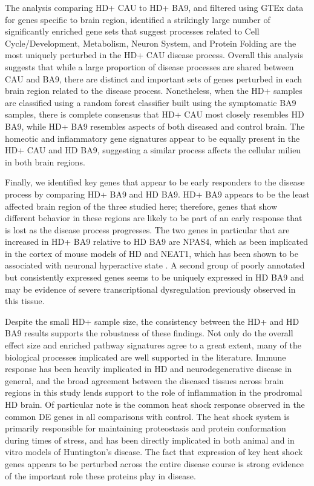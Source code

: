 \documentclass[fleqn,10pt,table]{wlscirep}
\begin{document}
The analysis comparing HD+ CAU to HD+ BA9, and filtered using GTEx data for genes specific to brain region, identified a strikingly large number of significantly enriched gene sets that suggest processes related to Cell Cycle/Development, Metabolism, Neuron System, and Protein Folding are the most uniquely perturbed in the HD+ CAU disease process.
Overall this analysis suggests that while a large proportion of disease processes are shared between CAU and BA9, there are distinct and important sets of genes perturbed in each brain region related to the disease process.
Nonetheless, when the HD+ samples are classified using a random forest classifier built using the symptomatic BA9 samples, there is complete consensus that HD+ CAU most closely resembles HD BA9, while HD+ BA9 resembles aspects of both diseased and control brain.
The homeotic and inflammatory gene signatures appear to be equally present in the HD+ CAU and HD BA9, suggesting a similar process affects the cellular milieu in both brain regions.

Finally, we identified key genes that appear to be early responders to the disease process by comparing HD+ BA9 and HD BA9.
HD+ BA9 appears to be the least affected brain region of the three studied here; therefore, genes that show different behavior in these regions are likely to be part of an early response that is lost as the disease process progresses.
The two genes in particular that are increased in HD+ BA9 relative to HD BA9 are NPAS4, which as been implicated in the cortex of mouse models of HD \cite{Vashishtha2013-su} and NEAT1, which has been shown to be associated with neuronal hyperactive state \cite{Barry2017-it}.
A second group of poorly annotated but consistently expressed genes seems to be uniquely expressed in HD BA9 and may be evidence of severe transcriptional dysregulation previously observed in this tissue\cite{Labadorf2017-qb,Labadorf2015-zf}.

Despite the small HD+ sample size, the consistency between the HD+ and HD BA9 results supports the robustness of these findings.
Not only do the overall effect size and enriched pathway signatures agree to a great extent, many of the biological processes implicated are well supported in the literature.
Immune response has been heavily implicated in HD and neurodegenerative disease in general\cite{Skaper2018-oh,Sekar2015-cl,Crotti2015-hz,Wang2015-ps,Heneka2015-iu,Labadorf2017-qb,Labadorf2015-zf}, and the broad agreement between the diseased tissues across brain regions in this study lends support to the role of inflammation in the prodromal HD brain.
Of particular note is the common heat shock response observed in the common DE genes in all comparisons with control.
The heat shock system is primarily responsible for maintaining proteostasis and protein conformation during times of stress, and has been directly implicated in both animal \cite{Riva2012-nx} and in vitro \cite{Chafekar2012-zh} models of Huntington's disease.
The fact that expression of key heat shock genes appears to be perturbed across the entire disease course is strong evidence of the important role these proteins play in disease.
\end{document}
